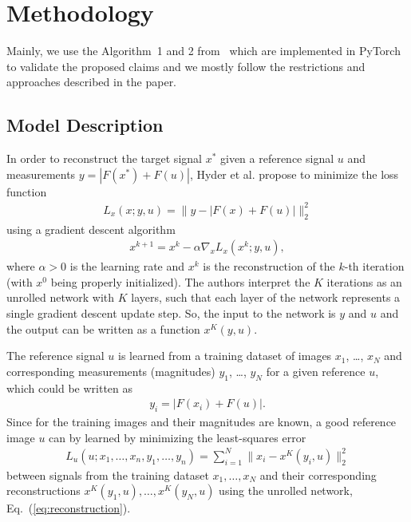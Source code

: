 \section{Methodology}


Mainly, we use the Algorithm~1 and 2 from~\cite{hyder2020solving} which are implemented in PyTorch~\cite{pytorch} to validate the proposed claims and we mostly follow the restrictions and approaches described in the paper.


\subsection{Model Description}

In order to reconstruct the target signal $x^*$ given  a reference signal $u$ and measurements
$y=|F(x^*) + F(u)|$, Hyder et al. \cite{hyder2020solving} propose to minimize the loss function
\begin{align}
	L_x(x; y, u) = \lVert y - \lvert F(x) + F(u) \rvert \rVert^2_2
\end{align}
using a gradient descent algorithm
\begin{align}
	\label{eq:reconstruction}
	x^{k + 1} = x^k - \alpha \nabla_xL_x(x^k; y, u),
\end{align}
where $\alpha>0$ is the learning rate and $x^k$ is the reconstruction
of the $k$-th iteration (with $x^0$ being properly initialized). The authors
interpret the $K$ iterations as an unrolled network with $K$ layers,
such that each layer of the network represents a single gradient
descent update step. So, the input to the network is $y$ and $u$ and
the output can be written as a function $x^K(y,u)$.

The reference signal $u$ is learned from a training dataset of images $x_1$,
\dots, $x_N$ and corresponding measurements (magnitudes) $y_1$, \dots,
$y_N$ for a given reference $u$, which could be written as
\begin{align}
  y_i = |F(x_i) + F(u)|.
\end{align}
Since for the training images and their magnitudes are known,
a good reference image $u$ can by learned by minimizing the least-squares error
\begin{align}
	\label{eq:reference-loss}
	L_u(u;x_1,\dots,x_n,y_1,\dots,y_n) = \sum_{i = 1}^{N} \lVert x_i - x^K(y_i, u) \rVert^2_2
\end{align}
between signals from the training dataset $x_1, \dots, x_N$ and their
corresponding reconstructions $x^K(y_1,u), \dots, x^K(y_N,u)$ using
the unrolled network, Eq.~(\ref{eq:reconstruction}).

